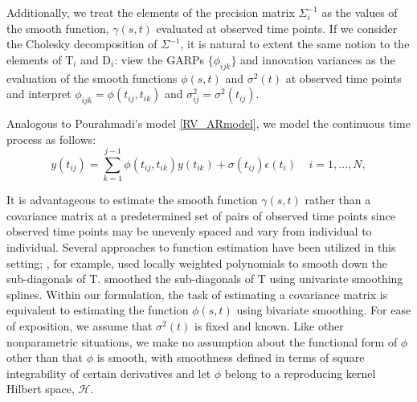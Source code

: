 \documentclass[12pt]{article}
\newcommand{\matD}{\mbox{D}}
\newcommand{\matT}{\mbox{T}}
\begin{document}
Additionally, we treat the elements of the precision matrix $\Sigma_i^{-1}$ as the values of the smooth function, $\gamma\left(s,t\right)$ evaluated at observed time points. If we consider the Cholesky decomposition of $\Sigma^{-1}$, it is natural to extent the same notion to the elements of $\matT_i$ and $\matD_i$: view the GARPs $\lbrace \phi_{ijk} \rbrace$ and innovation variances as the evaluation of the smooth functions $\phi\left(s,t\right)$ and $\sigma^2\left(t\right)$ at observed time points and interpret $\phi_{ijk} = \phi\left(t_{ij},t_{ik}\right)$ and $\sigma_{ij}^2 = \sigma^2\left(t_{ij}\right)$. 

Analogous to Pourahmadi's model \eqref{RV_ARmodel}, we model the continuous time process as follows: 
\begin{equation}   
y\left(t_{ij} \right)  = \sum_{k=1}^{j-1} \phi\left(t_{ij} ,t_{ik}\right) y\left(t_{ik}\right) + \sigma\left(t_{ij}\right)\epsilon\left({t_i}\right) \;\;\;\; i=1,\dots, N, 
\label{eq:MyModel} 
\end{equation}

It is advantageous to estimate the smooth function $\gamma\left(s,t\right)$ rather than a covariance matrix at a predetermined set of pairs of observed time points since observed time points may be unevenly spaced and vary from individual to individual. Several approaches to function estimation have been utilized in this setting; \cite{wu2003nonparametric}, for example, used locally weighted polynomials to smooth down the sub-diagonals of $\matT$. \cite{huang2007estimation} smoothed the sub-diagonals of $\matT$ using univariate smoothing splines.  Within our formulation, the task of estimating a covariance matrix is equivalent to estimating the function $\phi\left(s,t\right)$ using bivariate smoothing. For ease of exposition, we assume that $\sigma^2\left(t\right)$ is fixed and known. Like other nonparametric situations, we make no assumption about the functional form of $\phi$ other than that $\phi$ is smooth, with smoothness defined in terms of square integrability of certain derivatives and let $\phi$ belong to a reproducing kernel Hilbert space, $\mathcal{H}$.
\end{document}

